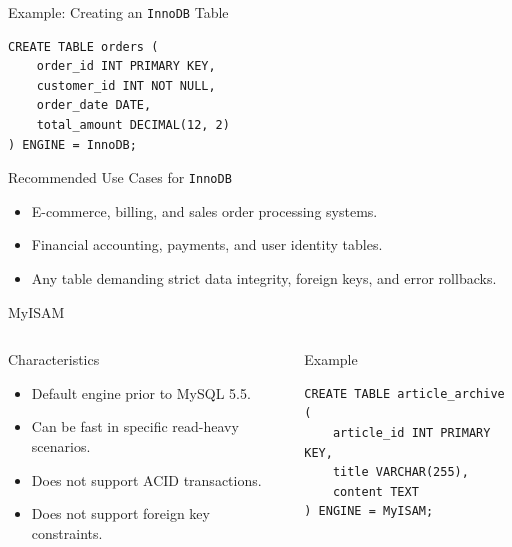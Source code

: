\documentclass[aspectratio=169,11pt]{beamer}
\newcommand{\code}[1]{\texttt{#1}}
\newcommand{\smallitem}{\setlength{\itemsep}{2pt}}
\begin{document}
\begin{frame}[fragile]{Example: Creating an \code{InnoDB} Table}
\begin{lstlisting}
CREATE TABLE orders (
    order_id INT PRIMARY KEY,
    customer_id INT NOT NULL,
    order_date DATE,
    total_amount DECIMAL(12, 2)
) ENGINE = InnoDB;
\end{lstlisting}
\begin{block}{Recommended Use Cases for \code{InnoDB}}
\begin{itemize}\smallitem
  \item E-commerce, billing, and sales order processing systems.
  \item Financial accounting, payments, and user identity tables.
  \item Any table demanding strict data integrity, foreign keys, and error rollbacks.
\end{itemize}
\end{block}
\end{frame}

\begin{frame}[fragile]{MyISAM}
\begin{columns}[T,onlytextwidth]
\begin{block}{Characteristics}
\begin{itemize}\smallitem
  \item Default engine prior to MySQL 5.5.
  \item Can be fast in specific read-heavy scenarios.
  \item Does not support ACID transactions.
  \item Does not support foreign key constraints.
\end{itemize}
\end{block}
\begin{block}{Example}
\begin{lstlisting}
CREATE TABLE article_archive (
    article_id INT PRIMARY KEY,
    title VARCHAR(255),
    content TEXT
) ENGINE = MyISAM;
\end{lstlisting}
\end{block}
\end{columns}
\end{frame}
\end{document}
